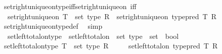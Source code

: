 \begin{isabellebody}
\isamarkupfalse%
\isanewline
\isanewline
{}\isamarkupfalse%
\ set{\isacharunderscore}{\kern0pt}right{\isacharunderscore}{\kern0pt}unique{\isacharunderscore}{\kern0pt}on{\isacharunderscore}{\kern0pt}type{\isacharunderscore}{\kern0pt}iff{\isacharunderscore}{\kern0pt}set{\isacharunderscore}{\kern0pt}right{\isacharunderscore}{\kern0pt}unique{\isacharunderscore}{\kern0pt}on\ {\isacharbrackleft}{\kern0pt}iff{\isacharbrackright}{\kern0pt}{\isacharcolon}{\kern0pt}\isanewline
\ \ {\isachardoublequoteopen}set{\isacharunderscore}{\kern0pt}right{\isacharunderscore}{\kern0pt}unique{\isacharunderscore}{\kern0pt}on\ {\isacharparenleft}{\kern0pt}T\ {\isacharcolon}{\kern0pt}{\isacharcolon}{\kern0pt}\ set\ type{\isacharparenright}{\kern0pt}\ R\ {\isasymlongleftrightarrow}\ set{\isacharunderscore}{\kern0pt}right{\isacharunderscore}{\kern0pt}unique{\isacharunderscore}{\kern0pt}on\ {\isacharparenleft}{\kern0pt}type{\isacharunderscore}{\kern0pt}pred\ T{\isacharparenright}{\kern0pt}\ R{\isachardoublequoteclose}\isanewline
%
\isadelimproof
\ \ %
\endisadelimproof
%
\isatagproof
{}\isamarkupfalse%
\ set{\isacharunderscore}{\kern0pt}right{\isacharunderscore}{\kern0pt}unique{\isacharunderscore}{\kern0pt}on{\isacharunderscore}{\kern0pt}type{\isacharunderscore}{\kern0pt}def\ \isamarkupfalse%
\ simp%
\endisatagproof
{\isafoldproof}%
%
\isadelimproof
\isanewline
%
\endisadelimproof
\isanewline
{}\isamarkupfalse%
\isanewline
\ \ set{\isacharunderscore}{\kern0pt}left{\isacharunderscore}{\kern0pt}total{\isacharunderscore}{\kern0pt}on{\isacharunderscore}{\kern0pt}type\ {\isasymequiv}\ {\isachardoublequoteopen}set{\isacharunderscore}{\kern0pt}left{\isacharunderscore}{\kern0pt}total{\isacharunderscore}{\kern0pt}on\ {\isacharcolon}{\kern0pt}{\isacharcolon}{\kern0pt}\ set\ type\ {\isasymRightarrow}\ set\ {\isasymRightarrow}\ bool{\isachardoublequoteclose}\isanewline
{}\isanewline
\ \ \isamarkupfalse%
\ {\isachardoublequoteopen}set{\isacharunderscore}{\kern0pt}left{\isacharunderscore}{\kern0pt}total{\isacharunderscore}{\kern0pt}on{\isacharunderscore}{\kern0pt}type\ {\isacharparenleft}{\kern0pt}T\ {\isacharcolon}{\kern0pt}{\isacharcolon}{\kern0pt}\ set\ type{\isacharparenright}{\kern0pt}\ R\ {\isasymequiv}\isanewline
\ \ \ \ set{\isacharunderscore}{\kern0pt}left{\isacharunderscore}{\kern0pt}total{\isacharunderscore}{\kern0pt}on\ {\isacharparenleft}{\kern0pt}type{\isacharunderscore}{\kern0pt}pred\ T{\isacharparenright}{\kern0pt}\ R{\isachardoublequoteclose}\isanewline
{}\isamarkupfalse%

\end{isabellebody}
